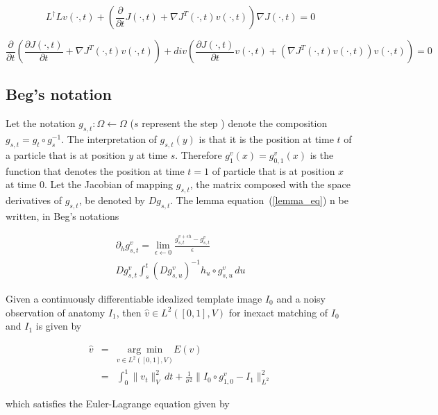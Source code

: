 \documentclass[final, paper=letter,5p,times,twocolumn]{elsarticle}
\theoremstyle{definition}
\begin{document}
{{$$
L^{\dag}Lv(\cdot,t) + \left( \frac{\partial}{\partial t} J(\cdot,t) + \nabla J^{T}(\cdot,t) v(\cdot,t) \right) \nabla J(\cdot,t) = 0
$$

$$
\frac{\partial}{\partial t}\left( \frac{\partial J(\cdot,t)}{\partial t} + \nabla J^{T}(\cdot,t) v(\cdot,t) \right) + div\left( \frac{\partial J(\cdot,t)}{\partial t} v(\cdot, t) + (\nabla J^{T}(\cdot,t) v(\cdot,t)) v(\cdot, t) \right) = 0
$$
}

\subsection{Beg's notation}

Let the notation $g_{s,t}: \Omega \leftarrow \Omega$ ($s$ represent the step ) denote the composition $g_{s,t} = g_{t} \circ g_{s}^{-1}$. The interpretation of $g_{s,t}(y)$ is that it is the position at time $t$ of a particle that is at position $y$ at time $s$. Therefore $g_{1}^{v}(x) = g_{0,1}^{v}(x)$  is the function that denotes the position at time $t = 1$ of particle that is at position $x$ at time 0. Let the Jacobian of mapping $g_{s,t}$, the matrix composed with the space derivatives of $g_{s,t}$, be denoted by $Dg_{s,t}$. The lemma equation~(\ref{lemma_eq}) n be written, in Beg's notations

\begin{equation*}
\begin{array}{lcl}
\partial_{h} g_{s,t}^{v} = \underset{\epsilon \leftarrow 0}{\lim} \frac{g_{s,t}^{v + \epsilon h} - g_{s,t}^{v}}{\epsilon}\\
D g_{s,t}^{v} \int_{s}^{t} \left( D g_{s,u}^{v} \right)^{-1} h_{u} \circ g_{s,u}^{v} \, du
\end{array}
\end{equation*}

Given a continuously differentiable idealized template image $I_{0}$ and a noisy observation of anatomy $I_{1}$, then $\hat{v} \in L^{2}([0,1],V)$ for inexact matching of $I_{0}$ and $I_{1}$ is given by

\begin{equation*}
\begin{array}{rcl}
\hat{v} & = &  \underset{v \in L^{2}([0,1],V)}{\arg\min} E(v)\\
& = & \int_{0}^{1} \| v_{t} \|_{V}^{2}\, dt + \frac{1}{\sigma^{2}} \| I_{0} \circ g_{1,0}^{v} - I_{1}\|_{L^{2}}^{2}
\end{array}
\end{equation*}

which satisfies the Euler-Lagrange equation given by

}
\end{document}
